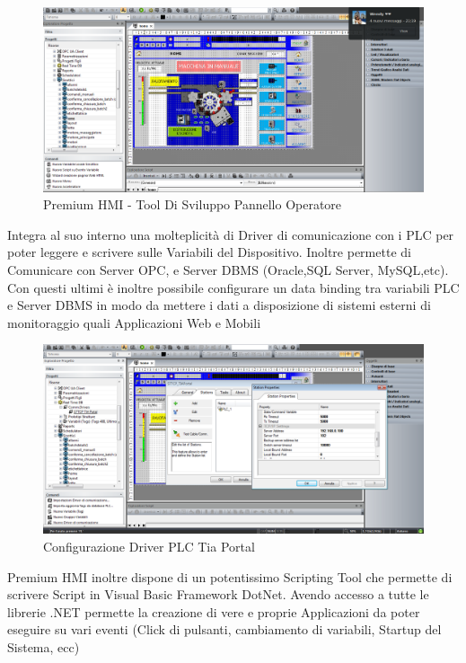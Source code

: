 \documentclass[12pt, a4paper, oneside]{book}
\begin{document}
	\begin{figure}[H]
	\centering
	\includegraphics[width=13cm]{Immagini/HMI1}
	\caption{Premium HMI - Tool Di Sviluppo Pannello Operatore}
	\label{HMI1}
\end{figure}

Integra al suo interno una molteplicità di Driver di comunicazione con i PLC per poter leggere e scrivere sulle Variabili del Dispositivo. Inoltre permette di Comunicare con Server OPC, e Server DBMS (Oracle,SQL Server, MySQL,etc). Con questi ultimi è inoltre possibile configurare un data binding tra variabili PLC e Server DBMS in modo da mettere i dati a disposizione di sistemi esterni di monitoraggio quali Applicazioni Web e Mobili

	\begin{figure}[H]
	\centering
	\includegraphics[width=13cm]{Immagini/HMI2}
	\caption{Configurazione Driver PLC Tia Portal}
	\label{HMI2}
\end{figure}

Premium HMI inoltre dispone di un potentissimo Scripting Tool che permette di scrivere Script in Visual Basic Framework DotNet. Avendo accesso a tutte le librerie .NET permette la creazione di vere e proprie Applicazioni da poter eseguire su vari eventi (Click di pulsanti, cambiamento di variabili, Startup del Sistema, ecc)
\end{document}
